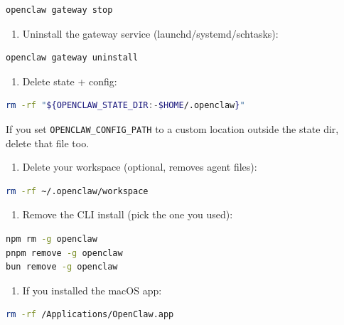 \begin{lstlisting}[language=bash]
openclaw gateway stop
\end{lstlisting}


\begin{enumerate}
  \item Uninstall the gateway service (launchd/systemd/schtasks):
\end{enumerate}


\begin{lstlisting}[language=bash]
openclaw gateway uninstall
\end{lstlisting}


\begin{enumerate}
  \item Delete state + config:
\end{enumerate}


\begin{lstlisting}[language=bash]
rm -rf "${OPENCLAW_STATE_DIR:-$HOME/.openclaw}"
\end{lstlisting}


If you set \texttt{OPENCLAW\_CONFIG\_PATH} to a custom location outside the state dir, delete that file too.

\begin{enumerate}
  \item Delete your workspace (optional, removes agent files):
\end{enumerate}


\begin{lstlisting}[language=bash]
rm -rf ~/.openclaw/workspace
\end{lstlisting}


\begin{enumerate}
  \item Remove the CLI install (pick the one you used):
\end{enumerate}


\begin{lstlisting}[language=bash]
npm rm -g openclaw
pnpm remove -g openclaw
bun remove -g openclaw
\end{lstlisting}


\begin{enumerate}
  \item If you installed the macOS app:
\end{enumerate}


\begin{lstlisting}[language=bash]
rm -rf /Applications/OpenClaw.app
\end{lstlisting}



